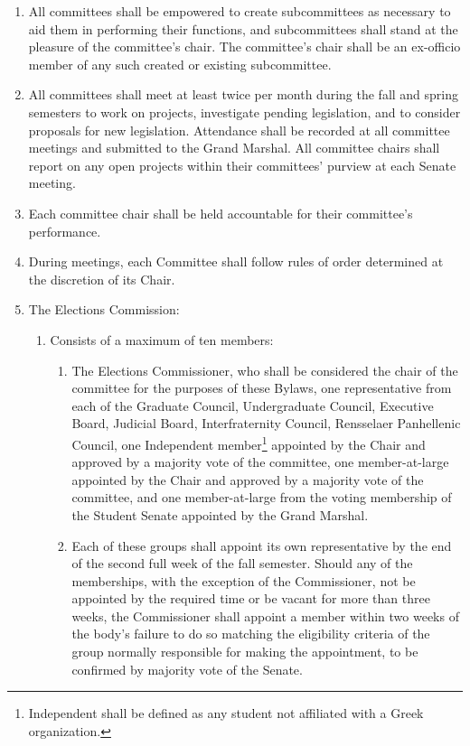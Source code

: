 \documentclass{uniondoc}
\begin{document}
\begin{enumerate}
\begin{enumerate}
\begin{enumerate}
		            \end{enumerate}
	      \end{enumerate}
	\item All committees shall be empowered to create subcommittees as necessary to aid them in performing their functions,
	      and subcommittees shall stand at the pleasure of the committee’s chair.
	      The committee’s chair shall be an ex-officio member of any such created or existing subcommittee.
	\item All committees shall meet at least twice per month during the fall and spring semesters to work on projects, investigate pending legislation, and to consider proposals for new legislation.
	      Attendance shall be recorded at all committee meetings and submitted to the Grand Marshal.
	      All committee chairs shall report on any open projects within their committees’ purview at each Senate meeting.
	\item Each committee chair shall be held accountable for their committee’s performance.
	\item During meetings, each Committee shall follow rules of order determined at the discretion of its Chair.
	\item The Elections Commission:
	      \begin{enumerate}
		      \item Consists of a maximum of ten members:
		            \begin{enumerate}
			            \item The Elections Commissioner, who shall be considered the chair of the committee for the purposes of these Bylaws, one representative from each of the Graduate Council, Undergraduate Council, Executive Board, Judicial Board, Interfraternity Council, Rensselaer Panhellenic Council, one Independent member\footnote[1]{Independent shall be defined as any student not affiliated with a Greek organization.}
			                  appointed by the Chair and approved by a majority vote of the committee, one member-at-large appointed by the Chair and approved by a majority vote of the committee, and one member-at-large from the voting membership of the Student Senate appointed by the Grand Marshal.
			            \item Each of these groups shall appoint its own representative by the end of the second full week of the fall semester.
			                  Should any of the memberships, with the exception of the Commissioner, not be appointed by the required time or be vacant for more than three weeks, the Commissioner shall appoint a member within two weeks of the body’s failure to do so matching the eligibility criteria of the group normally responsible for making the appointment, to be confirmed by majority vote of the Senate.

\end{enumerate}
\end{enumerate}
\end{enumerate}
\end{document}
